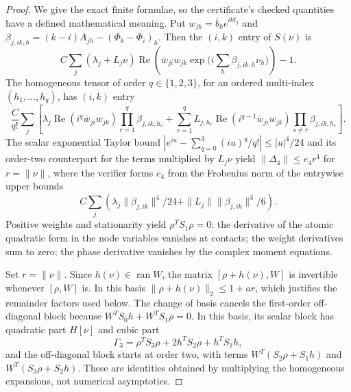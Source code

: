 \documentclass[11pt]{article}
\newcommand{\ran}{\operatorname{ran}}
\DeclareMathOperator{\Rea}{Re}
\begin{document}
\begin{proof}
We give the exact finite formulae, so the certificate's checked quantities have a defined mathematical meaning.  Put $w_{jk}=\bar b_ke^{ikt_j}$ and
$\beta_{j,ik,h}=(k-i)A_{jh}-(\Phi_k-\Phi_i)_h$.  Then the $(i,k)$ entry of $S(\nu)$ is
\[
 C\sum_j(\lambda_j+L_j\nu)\Rea\left(\bar w_{ji}w_{jk}
 \exp\bigl(i\sum_h\beta_{j,ik,h}\nu_h\bigr)\right)-1.
\]
The homogeneous tensor of order $q\in\{1,2,3\}$, for an ordered multi-index $(h_1,\ldots,h_q)$, has $(i,k)$ entry
\begin{equation}\label{eq:atom-tensor}
 \frac C{q!}\sum_j\left[\lambda_j\Rea(i^q\bar w_{ji}w_{jk})\prod_{r=1}^q\beta_{j,ik,h_r}
 +\sum_{r=1}^qL_{j,h_r}\Rea(i^{q-1}\bar w_{ji}w_{jk})
 \prod_{s\ne r}\beta_{j,ik,h_s}\right].
\end{equation}
The scalar exponential Taylor bound
$|e^{iu}-\sum_{q=0}^3(iu)^q/q!|\le|u|^4/24$
and its order-two counterpart for the terms multiplied by $L_j\nu$ yield
$\|\Delta_4\|\le e_4r^4$ for $r=\|\nu\|$, where the verifier forms $e_4$ from the Frobenius norm of the entrywise upper bounds
\[
 C\sum_j\left(\lambda_j\|\beta_{j,ik}\|^4/24+
 \|L_j\|\|\beta_{j,ik}\|^3/6\right).
\]
Positive weights and stationarity yield $\rho^TS_1\rho=0$: the derivative of the atomic quadratic form in the node variables vanishes at contacts; the weight derivatives sum to zero; the phase derivative vanishes by the complex moment equations.

Set $r=\|\nu\|$.  Since $h(\nu)\in\ran W$, the matrix
$[\rho+h(\nu),W]$ is invertible whenever $[\rho,W]$ is.
In this basis $\|\rho+h(\nu)\|_2\le1+ar$, which justifies the
remainder factors used below. The change of basis cancels the first-order
off-diagonal block because
$W^TS_0h+W^TS_1\rho=0$.  In this basis, its scalar block has quadratic part $H[\nu]$ and cubic part
\[
 \Gamma_3=\rho^TS_3\rho+2h^TS_2\rho+h^TS_1h,
\]
and the off-diagonal block starts at order two, with terms
$W^T(S_2\rho+S_1h)$ and $W^T(S_3\rho+S_2h)$.  These are identities obtained by multiplying the homogeneous expansions, not numerical asymptotics.


\end{proof}
\end{document}
